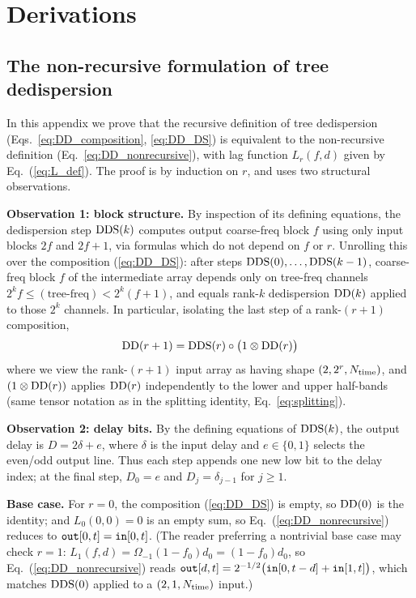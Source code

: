 \documentclass{article}
\numberwithin{equation}{section}   %
\def\DDS{{\rm DDS}}
\def\DD{{\rm DD}}
\begin{document}
\clearpage

\appendix

\section{Derivations}
\label{app:derivations}

\subsection{The non-recursive formulation of tree dedispersion}
\label{app:nonrecursive_proof}

In this appendix we prove that the recursive definition of tree dedispersion
(Eqs.\ \ref{eq:DD_composition}, \ref{eq:DD_DS}) is equivalent to the non-recursive definition
(Eq.\ \ref{eq:DD_nonrecursive}), with lag function $L_r(f,d)$ given by Eq.\ (\ref{eq:L_def}).
The proof is by induction on $r$, and uses two structural observations.

\par\noindent
{\bf Observation 1: block structure.}
By inspection of its defining equations, the dedispersion step $\DDS(k)$ computes output
coarse-freq block $f$ using only input blocks $2f$ and $2f+1$, via formulas which do not depend
on $f$ or $r$. Unrolling this over the composition (\ref{eq:DD_DS}): after steps
$\DDS(0), \ldots, \DDS(k-1)$, coarse-freq block $f$ of the intermediate array depends only on
tree-freq channels $2^k f \le (\mbox{tree-freq}) < 2^k (f+1)$, and equals rank-$k$ dedispersion
$\DD(k)$ applied to those $2^k$ channels. In particular, isolating the last step of a
rank-$(r+1)$ composition,
\begin{equation}
\DD(r+1) = \DDS(r) \circ \big( 1 \otimes \DD(r) \big)   \label{eq:app_last_step}
\end{equation}
where we view the rank-$(r+1)$ input array as having shape $(2, 2^r, N_{\rm time})$, and
$(1 \otimes \DD(r))$ applies $\DD(r)$ independently to the lower and upper half-bands
(same tensor notation as in the splitting identity, Eq.\ \ref{eq:splitting}).

\par\noindent
{\bf Observation 2: delay bits.}
By the defining equations of $\DDS(k)$, the output delay is $D = 2\delta + e$, where $\delta$ is
the input delay and $e \in \{0,1\}$ selects the even/odd output line. Thus each step appends one
new low bit to the delay index; at the final step, $D_0 = e$ and $D_j = \delta_{j-1}$ for
$j \ge 1$.

\par\noindent
{\bf Base case.}
For $r=0$, the composition (\ref{eq:DD_DS}) is empty, so $\DD(0)$ is the identity; and
$L_0(0,0) = 0$ is an empty sum, so Eq.\ (\ref{eq:DD_nonrecursive}) reduces to
${\tt out}[0,t] = {\tt in}[0,t]$. (The reader preferring a nontrivial base case may check $r=1$:
$L_1(f,d) = \Omega_{-1} (1-f_0) d_0 = (1-f_0) d_0$, so Eq.\ (\ref{eq:DD_nonrecursive}) reads
${\tt out}[d,t] = 2^{-1/2} \big( {\tt in}[0,t-d] + {\tt in}[1,t] \big)$, which matches $\DDS(0)$
applied to a $(2,1,N_{\rm time})$ input.)
\end{document}
